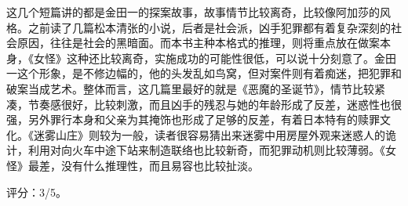 这几个短篇讲的都是金田一的探案故事，故事情节比较离奇，比较像阿加莎的风格。之前读了几篇松本清张的小说，后者是社会派，凶手犯罪都有着复杂深刻的社会原因，往往是社会的黑暗面。而本书主种本格式的推理，则将重点放在做案本身，《女怪》这种还比较离奇，实施成功的可能性很低，可以说十分刻意了。金田一这个形象，是不修边幅的，他的头发乱如鸟窝，但对案件则有着痴迷，把犯罪和破案当成艺术。整体而言，这几篇里最好的就是《恶魔的圣诞节》，情节比较紧凑，节奏感很好，比较刺激，而且凶手的残忍与她的年龄形成了反差，迷惑性也很强，另外罪行本身和父亲为其掩饰也形成了足够的反差，有着日本特有的赎罪文化。《迷雾山庄》则较为一般，读者很容易猜出来迷雾中用房屋外观来迷惑人的诡计，利用对向火车中途下站来制造联络也比较新奇，而犯罪动机则比较薄弱。《女怪》最差，没有什么推理性，而且易容也比较扯淡。

评分：3/5。